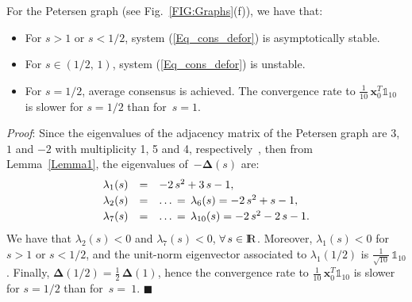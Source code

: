 \documentclass[letterpaper,9pt,twocolumn]{autart}
\newcommand{\rr}{\mathop{{\rm I}\mskip-4.0mu{\rm R}}\nolimits}
\newcommand{\vet}[1]{\ensuremath{{\mathbf #1}}}
\begin{document}
\begin{proposition}
For the Petersen graph (see Fig.~\ref{FIG:Graphs}(f)), we have that:
\begin{itemize}
\item For $s > 1$ or $s < 1/2$, system (\ref{Eq_cons_defor}) is asymptotically stable.
\item For $s \in (1/2,\,1)$, system (\ref{Eq_cons_defor}) is unstable.
\item For $s = 1/2$, average consensus is achieved. The convergence rate
to $\frac{1}{10}\,\vet{x}_0^T\mathds{1}_{10}$ is slower for $s = 1/2$ than for~$s = 1$.\vspace{-0.12cm}
\end{itemize}
\emph{Proof}:
Since the eigenvalues of the adjacency matrix of the Petersen graph
are $3$, $1$ and $-2$ with multiplicity 1, 5 and 4, respectively~\cite[Sect.~1.4.5]{BrouwerHa_book12}, 
then from Lemma~\ref{Lemma1}, the eigenvalues of~$-\boldsymbol{\Delta}(s)$ are:
$$
\begin{array}{lll}
\displaystyle \lambda_{1}(s) &=& -2\,s^2 + 3\,s - 1,\vspace{0.08cm}\\
\displaystyle \lambda_{2}(s) &=& \ldots\, =\, \lambda_{6}(s) = -2\,s^2 + s - 1,\vspace{0.08cm}\\
\displaystyle \lambda_{7}(s) &=& \ldots\, =\, \lambda_{10}(s) = -2\,s^2 - 2\,s - 1.
\end{array}
$$
We have that $\lambda_{2}(s) < 0$ and $\lambda_{7}(s) < 0$, $\forall\, s \in \rr$. Moreover,
$\lambda_{1}(s) < 0$ for $s > 1$ or $s < 1/2$, and the unit-norm eigenvector associated
to $\lambda_{1}(1/2)$ is $\frac{1}{\sqrt{10}}\,\mathds{1}_{10}$.
\mbox{Finally}, $\boldsymbol{\Delta}(1/2)  =
\frac{1}{2}\,\boldsymbol{\Delta}(1)$, 
hence the convergence rate to $\frac{1}{10}\,\vet{x}_0^T\mathds{1}_{10}$
is slower for $s = 1/2$ than for~$s =~1$.
\hfill$\blacksquare$
\end{proposition}
\end{document}
